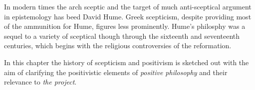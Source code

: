 In modern times the arch sceptic and the target of much anti-sceptical argument in epistemology has beed David Hume.
Greek scepticism, despite providing most of the ammunition for Hume, figures less prominently.
Hume's philosphy was a sequel to a variety of sceptical though through the sixteenth and seventeenth centuries, which begins with the religious controversies of the reformation.

In this chapter the history of scepticism and positivism is sketched out with the aim of clarifying the positivistic elements of \emph{positive philosophy} and their relevance to \emph{the project}.
